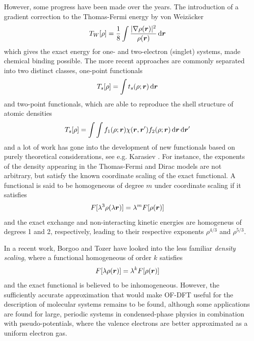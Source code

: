 However, some progress have been made over the years. The introduction of a gradient correction to the 
Thomas-Fermi energy by von Weiz\"{a}cker\cite{vonWeizacker:1935}
\begin{equation}
    \label{eq:vonWeizacker}
    T_W[\rho] = \frac{1}{8}\int\frac{|\nabla\rho(\boldsymbol r)|^2}{\rho(\boldsymbol r)}\,\mathrm{d}\boldsymbol r
\end{equation}
which gives the exact energy for one- and two-electron (singlet) systems, made chemical binding possible. The more 
recent approaches are commonly separated into two distinct classes, one-point functionals
\begin{equation}
    T_s[\rho] = \int t_s(\rho;\boldsymbol r)\,\mathrm{d}\boldsymbol r
\end{equation}
and two-point functionals, which are able to reproduce the shell structure of atomic densities\cite{Wang:1992}
\begin{equation}
    T_s[\rho] = \int\int f_1(\rho;\boldsymbol r)\chi(\boldsymbol r,\boldsymbol r')f_2(\rho;\boldsymbol r)\,\mathrm{d}\boldsymbol r\,\mathrm{d}\boldsymbol r'
\end{equation}
and a lot of work has gone into the development of new functionals based on purely theoretical 
considerations, see e.g. Karasiev \etal\cite{Karasiev:2009}. For 
instance, the exponents of the density appearing in the Thomas-Fermi and Dirac models are not arbitrary, but satisfy
the known coordinate scaling of the exact functional. A functional is said to be homogeneous of degree $m$ under
coordinate scaling if it satisfies
\begin{equation}
    F[\lambda^3\rho(\lambda\boldsymbol r)] = \lambda^mF[\rho(\boldsymbol r)]
\end{equation}
and the exact exchange and non-interacting kinetic energies are homogeneus of degrees 1 and 2, respectively, leading 
to their respective exponents $\rho^{4/3}$ and $\rho^{5/3}$. 

In a recent work, Borgoo and Tozer\cite{Borgoo:2013} have looked
into the less familiar \emph{density scaling}, where a functional homogeneous of order $k$ satisfies
\begin{equation}
    F[\lambda\rho(\boldsymbol r)] = \lambda^kF[\rho(\boldsymbol r)]
\end{equation}
and the exact functional is believed to be inhomogeneous.
However, the sufficiently accurate approximation that would make OF-DFT useful for the description of molecular
systems remains to be found\cite{Xia:2012}, although some applications are found for large, periodic systems in 
condensed-phase physics in combination with pseudo-potentials, where the valence electrons are better 
approximated as a uniform electron gas\cite{Hung:2009,Huang:2010}.

